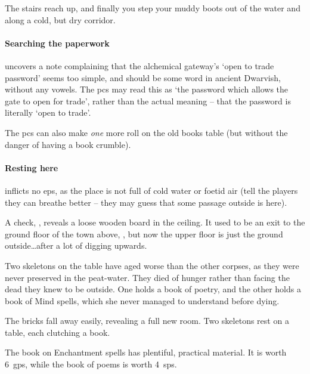 \begin{boxtext}
  The stairs reach up, and finally you step your muddy boots out of the water and along a cold, but dry corridor.
\end{boxtext}

\paragraph{Searching the paperwork}
uncovers a note complaining that the alchemical gateway's `open to trade password' seems too simple, and should be some word in ancient Dwarvish, without any vowels.
The \glspl{pc} may read this as `the password which allows the gate to open for trade', rather than the actual meaning -- that the password is literally `open to trade'.

The \glspl{pc} can also make \emph{one} more roll on the old books table  (but without the danger of having a book crumble).

\paragraph{Resting here}
inflicts no \glspl{ep}, as the place is not full of cold water or foetid air (tell the players they can breathe better -- they may guess that some passage outside is here).

A  check, \tn[10], reveals a loose wooden board in the ceiling.
It used to be an exit to the ground floor of the town above, , but now the upper floor is just the ground outside\ldots after a lot of digging upwards.


  Two skeletons on the table have aged worse than the other corpses, as they were never preserved in the peat-water.
  They died of hunger rather than facing the dead they knew to be outside.
  One holds a book of poetry, and the other holds a book of Mind spells, which she never managed to understand before dying.

\begin{boxtext}
  The bricks fall away easily, revealing a full new room.  Two skeletons rest on a table, each clutching a book.
\end{boxtext}

The book on Enchantment spells has plentiful, practical material.
It is worth 6~\glspl{gp}, while the book of poems is worth 4~\glspl{sp}.

